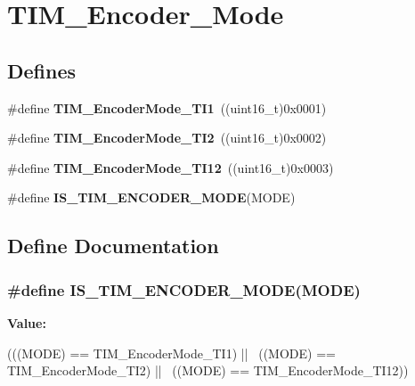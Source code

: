 \hypertarget{group__TIM__Encoder__Mode}{
\section{TIM\_\-Encoder\_\-Mode}
\label{group__TIM__Encoder__Mode}
}
\subsection*{Defines}
\begin{DoxyCompactItemize}
\item 
\hypertarget{group__TIM__Encoder__Mode_gabc63e3617a938382f87439ec58768b8e}{
\#define {\bfseries TIM\_\-EncoderMode\_\-TI1}~((uint16\_\-t)0x0001)}
\label{group__TIM__Encoder__Mode_gabc63e3617a938382f87439ec58768b8e}

\item 
\hypertarget{group__TIM__Encoder__Mode_ga5627a2d5d47b7301c7dbb29d20ae00e3}{
\#define {\bfseries TIM\_\-EncoderMode\_\-TI2}~((uint16\_\-t)0x0002)}
\label{group__TIM__Encoder__Mode_ga5627a2d5d47b7301c7dbb29d20ae00e3}

\item 
\hypertarget{group__TIM__Encoder__Mode_ga12511f903de08f1a634ff7828757f081}{
\#define {\bfseries TIM\_\-EncoderMode\_\-TI12}~((uint16\_\-t)0x0003)}
\label{group__TIM__Encoder__Mode_ga12511f903de08f1a634ff7828757f081}

\item 
\#define {\bfseries IS\_\-TIM\_\-ENCODER\_\-MODE}(MODE)
\end{DoxyCompactItemize}


\subsection{Define Documentation}
\hypertarget{group__TIM__Encoder__Mode_ga9dd5baa6b2a44e0f25068a650cbfdd1b}{
\subsubsection[{IS\_\-TIM\_\-ENCODER\_\-MODE}]{\setlength{\rightskip}{0pt plus 5cm}\#define IS\_\-TIM\_\-ENCODER\_\-MODE(MODE)}}
\label{group__TIM__Encoder__Mode_ga9dd5baa6b2a44e0f25068a650cbfdd1b}
{\bfseries Value:}
\begin{DoxyCode}
(((MODE) == TIM_EncoderMode_TI1) || \
                                   ((MODE) == TIM_EncoderMode_TI2) || \
                                   ((MODE) == TIM_EncoderMode_TI12))
\end{DoxyCode}
